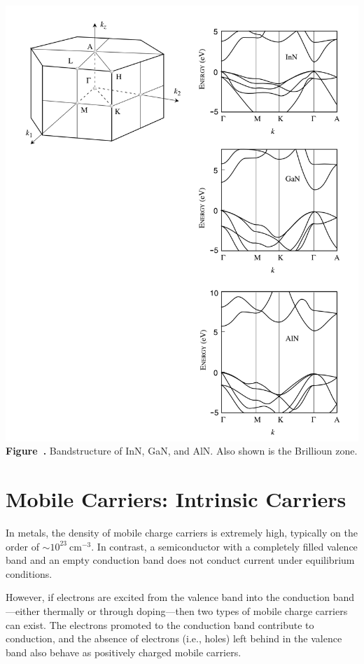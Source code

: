\begin{center}
	\begin{minipage}{0.7\textwidth}
		\centering
		\includegraphics[width=\textwidth]{img/bandstructure_materials.png}
		\\[0.5em]
		\textbf{Figure~\thefigure.}  Bandstructure of InN, GaN, and AlN. Also shown is the Brillioun zone.
		\label{fig:bandstructure_materials}
	\end{minipage}
\end{center}


\section{Mobile Carriers: Intrinsic Carriers}
In metals, the density of mobile charge carriers is extremely high, typically on the order of \( \sim 10^{23}~\text{cm}^{-3} \). In contrast, a semiconductor with a completely filled valence band and an empty conduction band does not conduct current under equilibrium conditions.

However, if electrons are excited from the valence band into the conduction band—either thermally or through doping—then two types of mobile charge carriers can exist. The electrons promoted to the conduction band contribute to conduction, and the absence of electrons (i.e., holes) left behind in the valence band also behave as positively charged mobile carriers.

